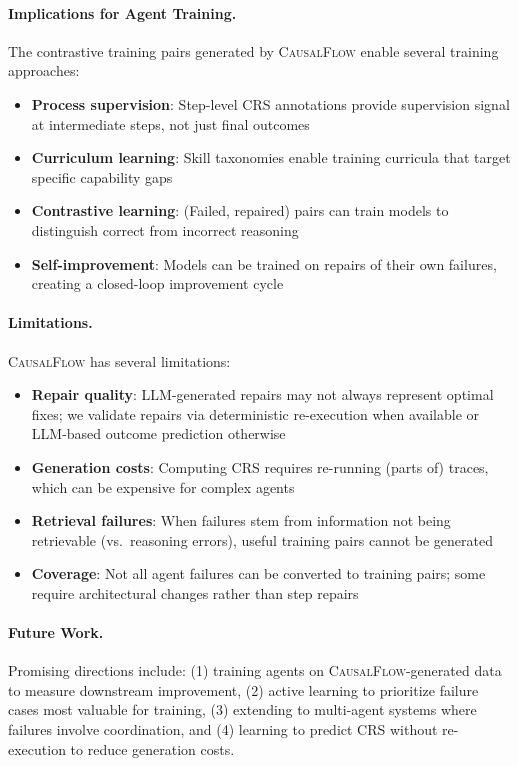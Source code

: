\documentclass{article}
\theoremstyle{plain}
\theoremstyle{definition}
\theoremstyle{remark}
\begin{document}
\paragraph{Implications for Agent Training.}
The contrastive training pairs generated by \textsc{CausalFlow} enable several training approaches:
\begin{itemize}
    \item \textbf{Process supervision}: Step-level CRS annotations provide supervision signal at intermediate steps, not just final outcomes
    \item \textbf{Curriculum learning}: Skill taxonomies enable training curricula that target specific capability gaps
    \item \textbf{Contrastive learning}: (Failed, repaired) pairs can train models to distinguish correct from incorrect reasoning
    \item \textbf{Self-improvement}: Models can be trained on repairs of their own failures, creating a closed-loop improvement cycle
\end{itemize}

\paragraph{Limitations.}
\textsc{CausalFlow} has several limitations:
\begin{itemize}
    \item \textbf{Repair quality}: LLM-generated repairs may not always represent optimal fixes; we validate repairs via deterministic re-execution when available or LLM-based outcome prediction otherwise
    \item \textbf{Generation costs}: Computing CRS requires re-running (parts of) traces, which can be expensive for complex agents
    \item \textbf{Retrieval failures}: When failures stem from information not being retrievable (vs.\ reasoning errors), useful training pairs cannot be generated
    \item \textbf{Coverage}: Not all agent failures can be converted to training pairs; some require architectural changes rather than step repairs
\end{itemize}

\paragraph{Future Work.}
Promising directions include: (1) training agents on \textsc{CausalFlow}-generated data to measure downstream improvement, (2) active learning to prioritize failure cases most valuable for training, (3) extending to multi-agent systems where failures involve coordination, and (4) learning to predict CRS without re-execution to reduce generation costs.
\end{document}
